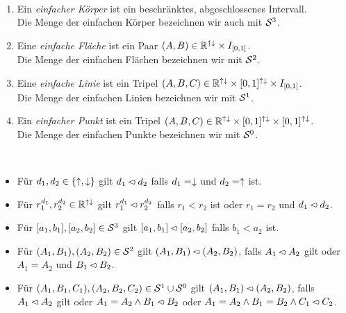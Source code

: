 \begin{dfn}\ %
    \begin{enumerate}
        \item Ein \emph{einfacher Körper} ist ein beschränktes, abgeschlossenes Intervall.\\ 
            Die Menge der einfachen Körper bezeichnen wir auch mit $\mathcal{S}^3$.
        \item Eine \emph{einfache Fläche} ist ein Paar $(A,B) \in \mathbb{R}^{{\uparrow \downarrow}} \times I_{[0,1]}$.\\
            Die Menge der einfachen Flächen bezeichnen wir mit $\mathcal{S}^2$.
        \item Eine \emph{einfache Linie} ist ein Tripel $(A,B,C) \in \mathbb{R}^{{\uparrow \downarrow}} \times [0,1]^{{\uparrow \downarrow}} \times I_{[0,1]}$.\\
            Die Menge der einfachen Linien bezeichnen wir mit $\mathcal{S}^1$.
        \item Ein \emph{einfacher Punkt} ist ein Tripel $(A,B,C) \in \mathbb{R}^{{\uparrow \downarrow}} \times [0,1]^{{\uparrow \downarrow}} \times [0,1]^{{\uparrow \downarrow}}$.\\
            Die Menge der einfachen Punkte bezeichnen wir mit $\mathcal{S}^0$.
    \end{enumerate}
\end{dfn}

\begin{dfn}\ 
    \begin{itemize}
        \item Für $d_1,d_2 \in \{\uparrow, \downarrow\}$ gilt $d_1 \leftslice d_2$ falls $d_1 = \downarrow$ und $d_2 = \uparrow$ ist. 
        \item Für $r_1^{d_1},r_2^{d_2} \in \mathbb{R}^{{\uparrow \downarrow}}$ gilt $r_1^{d_1} \leftslice r_2^{d_2}$ falls $r_1 < r_2$ ist oder $r_1 = r_2$ und $d_1 \leftslice d_2$.
        \item Für $[a_1,b_1], [a_2,b_2] \in \mathcal{S}^3$ gilt $[a_1,b_1] \leftslice [a_2,b_2]$ falls $b_1 < a_2$ ist.
        \item Für $(A_1,B_1), (A_2,B_2) \in \mathcal{S}^2$ gilt $(A_1,B_1) \leftslice (A_2,B_2)$, falls $A_1 \leftslice A_2$ gilt oder $A_1 = A_2$ und $B_1 \leftslice B_2$.
        \item Für $(A_1,B_1,C_1), (A_2,B_2,C_2) \in \mathcal{S}^1 \cup \mathcal{S}^0$ gilt $(A_1,B_1) \leftslice (A_2,B_2)$, falls $A_1 \leftslice A_2$ gilt oder $A_1 = A_2 \land B_1 \leftslice B_2$ oder $A_1 = A_2 \land B_1 = B_2 \land C_1 \leftslice C_2$.
    \end{itemize}
\end{dfn}

